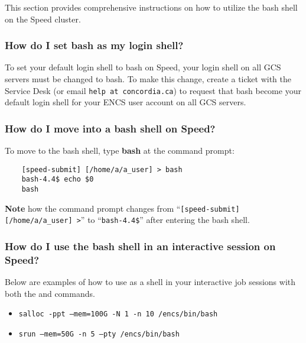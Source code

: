 This section provides comprehensive instructions on how to utilize the bash shell on the Speed cluster.

\subsubsection{How do I set bash as my login shell?}

To set your default login shell to bash on Speed, your login shell on all GCS servers must be changed to bash.
To make this change, create a ticket with the Service Desk (or email \texttt{help at concordia.ca}) to
request that bash become your default login shell for your ENCS user account on all GCS servers.

\subsubsection{How do I move into a bash shell on Speed?}

To move to the bash shell, type \textbf{bash} at the command prompt:
\begin{verbatim}
	[speed-submit] [/home/a/a_user] > bash
	bash-4.4$ echo $0
	bash
\end{verbatim}	

\noindent
\textbf{Note} how the command prompt changes from 
``\verb![speed-submit] [/home/a/a_user] >!'' to ``\verb!bash-4.4$!'' after entering the bash shell.

\subsubsection{How do I use the bash shell in an interactive session on Speed?}

Below are examples of how to use  as a shell in your interactive job sessions 
with both the  and  commands.

\begin{itemize}
	\item \texttt{salloc -ppt --mem=100G -N 1 -n 10 /encs/bin/bash}
	\item \texttt{srun --mem=50G -n 5 --pty /encs/bin/bash}
\end{itemize}

